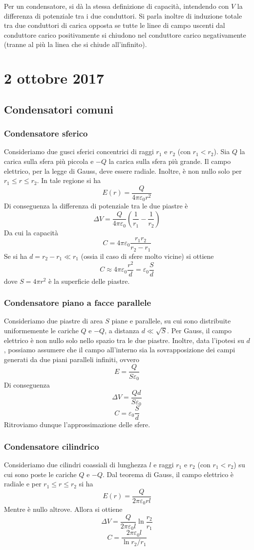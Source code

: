 \documentclass[a4paper,11pt]{book}
\let\oldepsilon\epsilon
\let\oldvarepsilon\varepsilon
\renewcommand{\epsilon}{\oldvarepsilon}
\renewcommand{\varepsilon}{\oldepsilon}
\theoremstyle{definition}
\theoremstyle{theorem}
\begin{document}
	Per un condensatore, si dà la stessa definizione di capacità, intendendo con $V$ la differenza di potenziale tra i due conduttori. Si parla inoltre di induzione totale tra due conduttori di carica opposta se tutte le linee di campo uscenti dal conduttore carico positivamente si chiudono nel conduttore carico negativamente (tranne al più la linea che si chiude all'infinito).
	\section{2 ottobre 2017}
	\subsection{Condensatori comuni}
	\subsubsection{Condensatore sferico}
	Consideriamo due gusci sferici concentrici di raggi $r_1$ e $r_2$ (con $r_1<r_2$). Sia $Q$ la carica sulla sfera più piccola e $-Q$ la carica sulla sfera più grande. Il campo elettrico, per la legge di Gauss, deve essere radiale. Inoltre, è non nullo solo per $r_1\leq r\leq r_2$. In tale regione si ha
	\[E(r)=\frac{Q}{4\pi\epsilon_0r^2}\]
	Di conseguenza la differenza di potenziale tra le due piastre è
	\[\Delta V=\frac{Q}{4\pi\epsilon_0}\left(\frac{1}{r_1}-\frac{1}{r_2}\right)\]
	Da cui la capacità
	\[C=4\pi\epsilon_0\frac{r_1r_2}{r_2-r_1}\]
	Se si ha $d=r_2-r_1\ll r_1$ (ossia il caso di sfere molto vicine) si ottiene
	\[C\approx4\pi\epsilon_0\frac{r^2}{d}=\epsilon_0\frac{S}{d}\]
	dove $S=4\pi r^2$ è la superficie delle piastre.
	\subsubsection{Condensatore piano a facce parallele}
	Consideriamo due piastre di area $S$ piane e parallele, su cui sono distribuite uniformemente le cariche $Q$ e $-Q$, a distanza $d\ll\sqrt{S}$. Per Gauss, il campo elettrico è non nullo solo nello spazio tra le due piastre. Inoltre, data l'ipotesi su $d$, possiamo assumere che il campo all'interno sia la sovrapposizione dei campi generati da due piani paralleli infiniti, ovvero
	\[E=\frac{Q}{S\epsilon_0}\]
	Di conseguenza
	\[\Delta V=\frac{Qd}{S\epsilon_0}\]
	\[C=\epsilon_0\frac{S}{d}\]
	Ritroviamo dunque l'approssimazione delle sfere.
	\subsubsection{Condensatore cilindrico}
	Consideriamo due cilindri coassiali di lunghezza $l$ e raggi $r_1$ e $r_2$ (con $r_1<r_2$) su cui sono poste le cariche $Q$ e $-Q$. Dal teorema di Gauss, il campo elettrico è radiale e per $r_1\leq r\leq r_2$ si ha
	\[E(r)=\frac{Q}{2\pi\epsilon_0rl}\]
	Mentre è nullo altrove. Allora si ottiene
	\[\Delta V=\frac{Q}{2\pi\epsilon_0l}\ln \frac{r_2}{r_1}\]
	\[C=\frac{2\pi\epsilon_0l}{\ln r_2/r_1}\]
\end{document}
